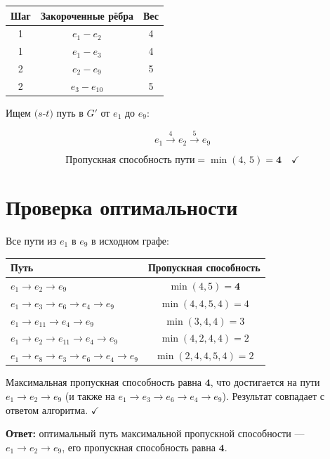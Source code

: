 \documentclass[a4paper,12pt]{article}
\begin{document}
\begin{center}
	\begin{tabular}{|c|c|c|}
		\hline
		\textbf{Шаг} & \textbf{Закороченные рёбра} & \textbf{Вес} \\
		\hline
		1            & $e_1 - e_2$                 & 4            \\
		1            & $e_1 - e_3$                 & 4            \\
		2            & $e_2 - e_9$                 & 5            \\
		2            & $e_3 - e_{10}$              & 5            \\
		\hline
	\end{tabular}
\end{center}

Ищем $(s$-$t)$ путь в $G'$ от $e_1$ до $e_9$:

\[
	e_1 \xrightarrow{4} e_2 \xrightarrow{5} e_9
\]

\[
	\text{Пропускная способность пути} = \min(4,\, 5) = \mathbf{4} \quad \checkmark
\]

\section*{Проверка оптимальности}

Все пути из $e_1$ в $e_9$ в исходном графе:

\begin{center}
	\renewcommand{\arraystretch}{1.3}
	\begin{tabular}{|l|c|}
		\hline
		\textbf{Путь}                                 & \textbf{Пропускная способность} \\
		\hline
		$e_1 \to e_2 \to e_9$                         & $\min(4,5) = \mathbf{4}$        \\
		$e_1 \to e_3 \to e_6 \to e_4 \to e_9$         & $\min(4,4,5,4) = 4$             \\
		$e_1 \to e_{11} \to e_4 \to e_9$              & $\min(3,4,4) = 3$               \\
		$e_1 \to e_2 \to e_{11} \to e_4 \to e_9$      & $\min(4,2,4,4) = 2$             \\
		$e_1 \to e_8 \to e_3 \to e_6 \to e_4 \to e_9$ & $\min(2,4,4,5,4) = 2$           \\
		\hline
	\end{tabular}
\end{center}

Максимальная пропускная способность равна $\mathbf{4}$, что достигается на пути
$e_1 \to e_2 \to e_9$ (и также на $e_1 \to e_3 \to e_6 \to e_4 \to e_9$). Результат совпадает с ответом алгоритма. $\checkmark$

\bigskip
\noindent\textbf{Ответ:} оптимальный путь максимальной пропускной способности ---
$e_1 \to e_2 \to e_9$, его пропускная способность равна $\boldsymbol{4}$.
\end{document}
